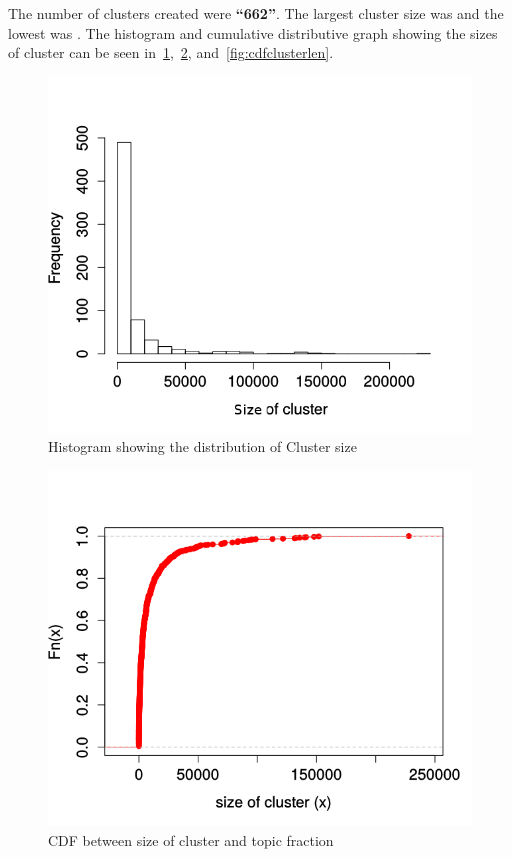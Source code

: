 The number of clusters created were \textbf{``662''}.
The largest cluster size was {\getlargestclustersize{}} and the lowest was {\getlowestclustersize{}}.
The histogram and cumulative distributive graph showing the sizes of cluster can be seen in~\ref{fig:histclustersize},~\ref{fig:ecdfclustersize}, and~\ref{fig:cdfclusterlen}.\\
\begin{figure}[htbp]
\begin{center}
  \includegraphics[scale=0.5]{figures/histclustersize_new.png}
\end{center}
\caption{Histogram showing the distribution of Cluster size}
\label{fig:histclustersize}
\end{figure}
\begin{figure}[htbp]
\begin{center}
  \includegraphics[scale=0.5]{figures/ecdfclustersize.png}
\end{center}
\caption{CDF between size of cluster and topic fraction}
\label{fig:ecdfclustersize}
\end{figure}
